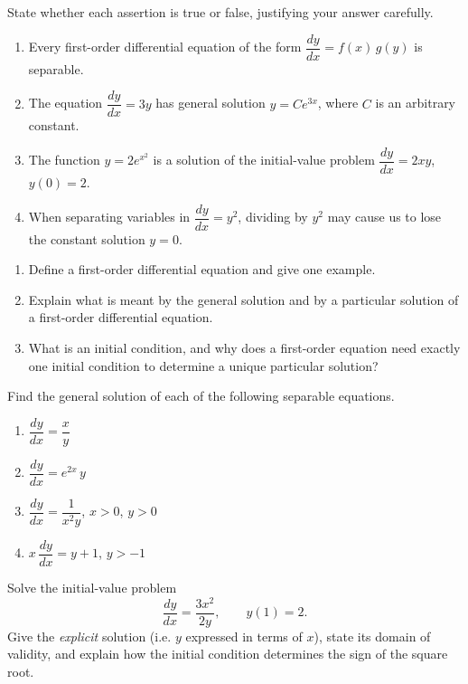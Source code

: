 \documentclass[11pt]{article}
\newcommand{\cle}[1]{{\popxbold\color{popdark}#1}}
\newcounter{popsec}
\newcounter{popsub}
\newcommand{\courssub}[1]{%
  \stepcounter{popsub}%
  \par\vspace{9pt}\noindent{\popxbold\fontsize{11.5}{13}\selectfont\color{popink}{\color{poporange}\thepopsec.\thepopsub}\hspace{6pt}#1}\par\nopagebreak\vspace{4pt}
}
\begin{document}
\begin{exercice}
State whether each assertion is true or false, justifying your answer carefully.
\begin{enumerate}
\item Every first-order differential equation of the form $\dfrac{dy}{dx}=f(x)\,g(y)$ is separable.
\item The equation $\dfrac{dy}{dx}=3y$ has general solution $y=Ce^{3x}$, where $C$ is an arbitrary constant.
\item The function $y=2e^{x^{2}}$ is a solution of the initial-value problem $\dfrac{dy}{dx}=2xy$, $y(0)=2$.
\item When separating variables in $\dfrac{dy}{dx}=y^{2}$, dividing by $y^{2}$ may cause us to lose the constant solution $y=0$.
\end{enumerate}
\end{exercice}

\begin{exercice}[Definitions]
\begin{enumerate}
\item Define a \cle{first-order differential equation} and give one example.
\item Explain what is meant by the \cle{general solution} and by a \cle{particular solution} of a first-order differential equation.
\item What is an \cle{initial condition}, and why does a first-order equation need exactly one initial condition to determine a unique particular solution?
\end{enumerate}
\end{exercice}

\begin{exercice}
Find the general solution of each of the following separable equations.
\begin{enumerate}
\item $\dfrac{dy}{dx}=\dfrac{x}{y}$
\item $\dfrac{dy}{dx}=e^{2x}\,y$
\item $\dfrac{dy}{dx}=\dfrac{1}{x^{2}y}$, \quad $x>0$, $y>0$
\item $x\,\dfrac{dy}{dx}=y+1$, \quad $y>-1$
\end{enumerate}
\end{exercice}

\courssub{I practise}

\begin{exercice}
Solve the initial-value problem
\[
\frac{dy}{dx}=\frac{3x^{2}}{2y},\qquad y(1)=2.
\]
Give the \emph{explicit} solution (i.e. $y$ expressed in terms of $x$), state its domain of validity, and explain how the initial condition determines the sign of the square root.
\end{exercice}
\end{document}

